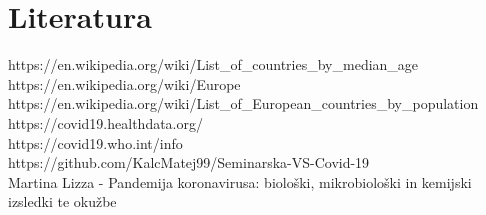 \documentclass[a4paper,11pt]{article}
\begin{document}
\section{Literatura}
https://en.wikipedia.org/wiki/List_of_countries_by_median_age \\
https://en.wikipedia.org/wiki/Europe \\
https://en.wikipedia.org/wiki/List_of_European_countries_by_population \\
https://covid19.healthdata.org/ \\
https://covid19.who.int/info \\
https://github.com/KalcMatej99/Seminarska-VS-Covid-19 \\
Martina Lizza - Pandemija koronavirusa: biološki, mikrobiološki in kemijski izsledki te okužbe
\end{document}
